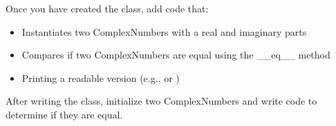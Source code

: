 		Once you have created the class, add code that:
		\begin{itemize}
			\item Instantiates two ComplexNumbers with a real and imaginary parts
			\item Compares if two ComplexNumbers are equal using the \_\_eq\_\_  method		
			\item Printing a readable version (e.g.,  or )
		\end{itemize}
		
		
		After writing the class, initialize two ComplexNumbers and write code to determine if
		they are equal.



